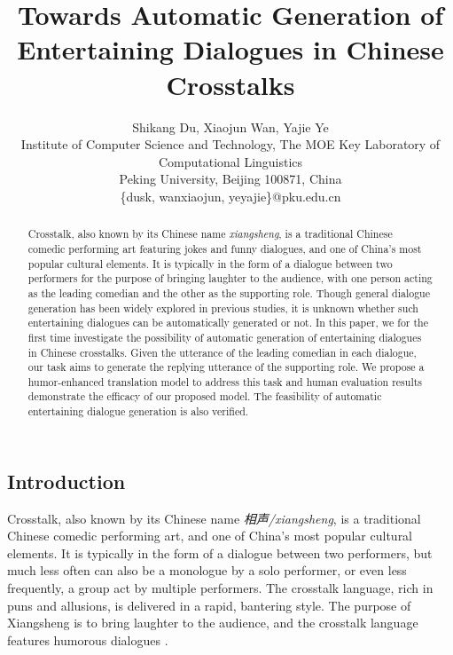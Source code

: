 \documentclass[letterpaper]{article} %
\begin{document}
%
\title{Towards Automatic Generation of Entertaining Dialogues in Chinese Crosstalks}
\author{Shikang Du, Xiaojun Wan, Yajie Ye\\
Institute of Computer Science and Technology, The MOE Key Laboratory of Computational Linguistics\\
Peking University, Beijing 100871, China\\
\{dusk, wanxiaojun, yeyajie\}@pku.edu.cn\\
}

\begin{CJK*}{UTF8}{gbsn}
	
\maketitle
\begin{abstract}
	Crosstalk, also known by its Chinese name {\it xiangsheng}, is a traditional Chinese comedic performing art featuring jokes and funny dialogues, and one of China's most popular cultural elements. It is typically in the form of a dialogue between two performers for the purpose of bringing laughter to the audience, with one person acting as the leading comedian and the other as the supporting role. Though general dialogue generation has been widely explored in previous studies, it is unknown whether such entertaining dialogues can be automatically generated or not. In this paper, we for the first time investigate the possibility of automatic generation of entertaining dialogues in Chinese crosstalks. Given the utterance of the leading comedian in each dialogue, our task aims to generate the replying utterance of the supporting role. We propose a humor-enhanced translation model to address this task and human evaluation results demonstrate the efficacy of our proposed model. The feasibility of automatic entertaining dialogue generation is also verified.
	
\end{abstract}


\section{Introduction}

Crosstalk, also known by its Chinese name \textit{相声/xiangsheng}, is a traditional Chinese comedic performing art, and one of China's most popular cultural elements. It is typically in the form of a dialogue between two performers, but much less often can also be a monologue by a solo performer, or even less frequently, a group act by multiple performers. The crosstalk language, rich in puns and allusions, is delivered in a rapid, bantering style. The purpose of Xiangsheng is to bring laughter to the audience, and the crosstalk language features humorous dialogues \cite{link1979genie,moser1990reflexivity,terence2013china,mackerras2013performing}.  


\end{CJK*}
\end{document}
